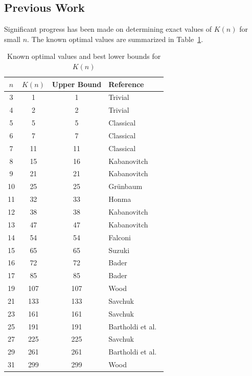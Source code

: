 \documentclass[11pt,a4paper]{article}
\theoremstyle{plain}
\theoremstyle{definition}
\theoremstyle{remark}
\newcommand{\K}{K}
\begin{document}
\subsection{Previous Work}

Significant progress has been made on determining exact values of $\K(n)$ for small $n$. The known optimal values are summarized in Table~\ref{tab:known}.

\begin{table}[htbp]
\centering
\caption{Known optimal values and best lower bounds for $\K(n)$}
\label{tab:known}
\begin{tabular}{@{}cccl@{}}
\toprule
$n$ & $\K(n)$ & Upper Bound & Reference \\
\midrule
3 & 1 & 1 & Trivial \\
4 & 2 & 2 & Trivial \\
5 & 5 & 5 & Classical \\
6 & 7 & 7 & Classical \\
7 & 11 & 11 & Classical \\
8 & 15 & 16 & Kabanovitch \cite{kabanovitch1999} \\
9 & 21 & 21 & Kabanovitch \cite{kabanovitch1999} \\
10 & 25 & 25 & Gr\"unbaum \cite{grunbaum2003} \\
11 & 32 & 33 & Honma \cite{honma2006} \\
12 & 38 & 38 & Kabanovitch \cite{kabanovitch1999} \\
13 & 47 & 47 & Kabanovitch \cite{kabanovitch1999} \\
14 & 54 & 54 & Falconi \cite{falconi2026} \\
15 & 65 & 65 & Suzuki \cite{suzuki2005} \\
16 & 72 & 72 & Bader \cite{bader2007} \\
17 & 85 & 85 & Bader \cite{bader2007} \\
19 & 107 & 107 & Wood \cite{wood2026} \\
21 & 133 & 133 & Savchuk \cite{savchuk2025} \\
23 & 161 & 161 & Savchuk \cite{savchuk2025} \\
25 & 191 & 191 & Bartholdi et al.\ \cite{bartholdi2007} \\
27 & 225 & 225 & Savchuk \cite{savchuk2025} \\
29 & 261 & 261 & Bartholdi et al.\ \cite{bartholdi2007} \\
31 & 299 & 299 & Wood \cite{wood2026} \\
\bottomrule
\end{tabular}
\end{table}
\end{document}
